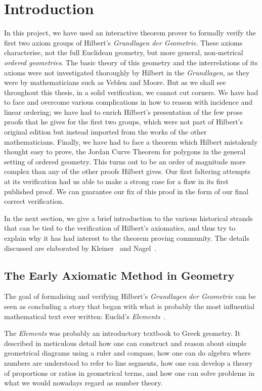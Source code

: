 \chapter{Introduction}\label{chapter:Introduction}
In this project, we have used an interactive theorem prover to formally verify the first two axiom groups of Hilbert's \emph{Grundlagen der Geometrie}. These axioms characterise, not the full Euclidean geometry, but more general, non-metrical \emph{ordered geometries}. The basic theory of this geometry and the interrelations of its axioms were not investigated thoroughly by Hilbert in the \emph{Grundlagen}, as they were by mathematicians such as Veblen and Moore. But as we shall see throughout this thesis, in a solid verification, we cannot cut corners. We have had to face and overcome various complications in how to reason with incidence and linear ordering; we have had to enrich Hilbert's presentation of the few prose proofs that he gives for the first two groups, which were not part of Hilbert's original edition but instead imported from the works of the other mathematicians. Finally, we have had to face a theorem which Hilbert mistakenly thought easy to prove, the Jordan Curve Theorem for polygons in the general setting of ordered geometry. This turns out to be an order of magnitude more complex than any of the other proofs Hilbert gives. Our first faltering attempts at its verification had us able to make a strong case for a flaw in its first published proof. We can guarantee our fix of this proof in the form of our final correct verification. 

In the next section, we give a brief introduction to the various historical strands that can be tied to the verification of Hilbert's axiomatics, and thus try to explain why it has had interest to the theorem proving community. The details discussed are elaborated by Kleiner~\cite{RigourProof} and Nagel~\cite{NagelModernGeometry}.

\section{The Early Axiomatic Method in Geometry}
The goal of formalising and verifying Hilbert's \emph{Grundlagen der Geometrie} can be seen as concluding a story that began with what is probably the most influential~\cite{BoyerEuclidInfluence} mathematical text ever written: Euclid's \emph{Elements}~\cite{HeathElements}.

The \emph{Elements} was probably an introductory textbook to Greek geometry. It described in meticulous detail how one can construct and reason about simple geometrical diagrams using a ruler and compass, how one can do algebra where numbers are understood to refer to line segments, how one can develop a theory of proportions or ratios in geometrical terms, and how one can solve problems in what we would nowadays regard as number theory.

